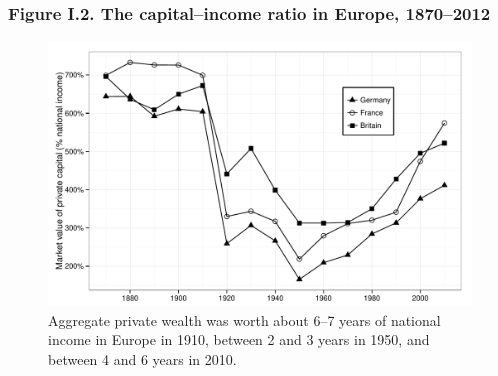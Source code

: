\documentclass[t]{beamer}\usepackage[]{graphicx}\usepackage[]{color}
\newenvironment{knitrout}{}{} %
\begin{document}
\begin{frame}[label=Figure_0_2,fragile]
\frametitle{Figure I.2. The capital--income ratio in Europe, 1870--2012}
\begin{figure}[t]
\begin{minipage}[b]{\textwidth}
\centering
\begin{knitrout}\footnotesize
{}\color{fgcolor}

{\centering \includegraphics[width=1\linewidth]{figures/bw/Figure_0_2} 

}



\end{knitrout}
\caption{Aggregate private wealth was worth about 6--7 years of national income in Europe in 1910, between 2 and 3 years in 1950, and between 4 and 6 years in 2010.}
\end{minipage}
\end{figure}
\end{frame}
\end{document}
